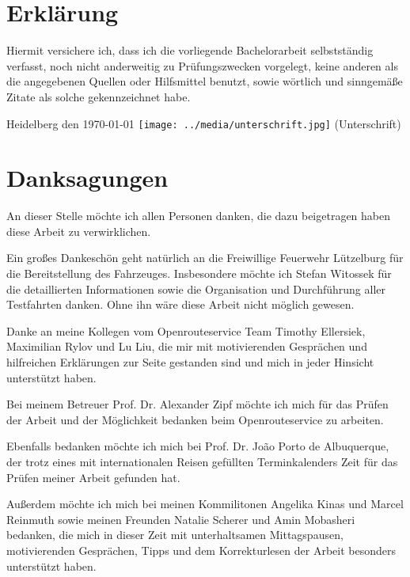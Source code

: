\newpage
\section*{Erklärung}
\vspace{1cm}
Hiermit versichere ich, dass ich die vorliegende Bachelorarbeit selbstständig verfasst, noch nicht anderweitig zu Prüfungszwecken vorgelegt, keine anderen als die angegebenen Quellen oder Hilfsmittel benutzt, sowie wörtlich und sinngemäße Zitate als solche gekennzeichnet habe.\par
\bigskip

{\flushleft\vspace{-1.5cm} Heidelberg den \today } \vspace{-1cm}
{\hfill\vspace*{1cm}\texttt{[image: ../media/unterschrift.jpg]}}
{\flushright\vspace{-1.2cm}\hfill (Unterschrift)      }

\newpage
\section*{Danksagungen}

An dieser Stelle möchte ich allen Personen danken, die dazu beigetragen haben diese Arbeit zu verwirklichen.\par
\vspace{0.5cm}
Ein großes Dankeschön geht natürlich an die Freiwillige Feuerwehr Lützelburg für die Bereitstellung des Fahrzeuges.
Insbesondere möchte ich Stefan Witossek für die detaillierten Informationen sowie die Organisation und Durchführung aller Testfahrten danken.
Ohne ihn wäre diese Arbeit nicht möglich gewesen.\par
\vspace{0.5cm}
Danke an meine Kollegen vom Openrouteservice Team Timothy Ellersiek, Maximilian Rylov und Lu Liu, die mir mit motivierenden Gesprächen und hilfreichen Erklärungen zur Seite gestanden sind und mich in jeder Hinsicht unterstützt haben.\par
\vspace{0.5cm}
Bei meinem Betreuer Prof. Dr. Alexander Zipf möchte ich mich für das Prüfen der Arbeit und der Möglichkeit bedanken beim Openrouteservice zu arbeiten.\par
Ebenfalls bedanken möchte ich mich bei Prof. Dr. Jo\~ao Porto de Albuquerque, der trotz eines mit internationalen Reisen gefüllten Terminkalenders Zeit für das Prüfen meiner Arbeit gefunden hat.\par
\vspace{0.5cm}
Außerdem möchte ich mich bei meinen Kommilitonen Angelika Kinas und Marcel Reinmuth sowie meinen Freunden Natalie Scherer und Amin Mobasheri bedanken, die mich in dieser Zeit mit unterhaltsamen Mittagspausen, motivierenden Gesprächen, Tipps und dem Korrekturlesen der Arbeit besonders unterstützt haben.


\newpage
\vspace{1cm}

